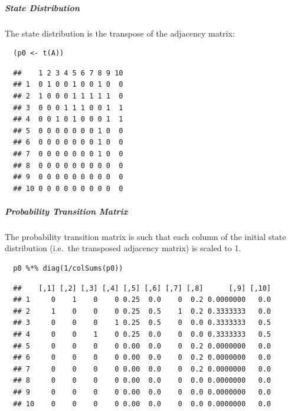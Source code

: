 \documentclass[11pt]{article}
\begin{document}
\subparagraph{State Distribution}
\label{state-distribution}
The state distribution is the transpose of the adjacency matrix:

\begin{verbatim}
  (p0 <- t(A))
\end{verbatim}

\begin{verbatim}
  ##    1 2 3 4 5 6 7 8 9 10
  ## 1  0 1 0 0 1 0 0 1 0  0
  ## 2  1 0 0 0 1 1 1 1 1  0
  ## 3  0 0 0 1 1 1 0 0 1  1
  ## 4  0 0 1 0 1 0 0 0 1  1
  ## 5  0 0 0 0 0 0 0 1 0  0
  ## 6  0 0 0 0 0 0 0 1 0  0
  ## 7  0 0 0 0 0 0 0 1 0  0
  ## 8  0 0 0 0 0 0 0 0 0  0
  ## 9  0 0 0 0 0 0 0 0 0  0
  ## 10 0 0 0 0 0 0 0 0 0  0
\end{verbatim}

\subparagraph{Probability Transition Matrix}
\label{probability-transition-matrix}
The probability transition matrix is such that each column of the
initial state distribution (i.e. the transposed adjacency matrix) is
scaled to 1.

\begin{verbatim}
  p0 %*% diag(1/colSums(p0))
\end{verbatim}

\begin{verbatim}
  ##    [,1] [,2] [,3] [,4] [,5] [,6] [,7] [,8]      [,9] [,10]
  ## 1     0    1    0    0 0.25  0.0    0  0.2 0.0000000   0.0
  ## 2     1    0    0    0 0.25  0.5    1  0.2 0.3333333   0.0
  ## 3     0    0    0    1 0.25  0.5    0  0.0 0.3333333   0.5
  ## 4     0    0    1    0 0.25  0.0    0  0.0 0.3333333   0.5
  ## 5     0    0    0    0 0.00  0.0    0  0.2 0.0000000   0.0
  ## 6     0    0    0    0 0.00  0.0    0  0.2 0.0000000   0.0
  ## 7     0    0    0    0 0.00  0.0    0  0.2 0.0000000   0.0
  ## 8     0    0    0    0 0.00  0.0    0  0.0 0.0000000   0.0
  ## 9     0    0    0    0 0.00  0.0    0  0.0 0.0000000   0.0
  ## 10    0    0    0    0 0.00  0.0    0  0.0 0.0000000   0.0
\end{verbatim}
\end{document}
